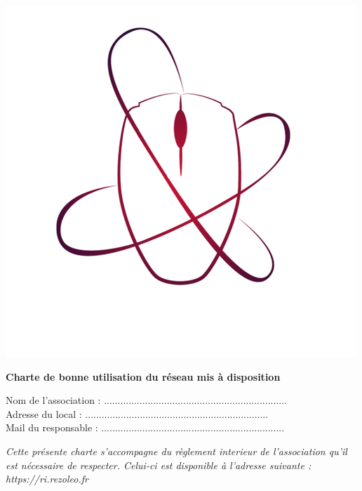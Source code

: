 \documentclass[11pt]{article}
\begin{document}
	
\thispagestyle{empty}

\begin{minipage}{0.15\linewidth}
	\includegraphics[scale=0.18]{rezoleo.png}
\end{minipage}\hfill
\begin{minipage}{0.80\linewidth}\center
{\LARGE \textbf{Charte de bonne utilisation du réseau mis à disposition}}

\vspace*{0.5cm}

\begin{flushright}
	Nom de l'association : ...................................................................\\
	Adresse du local : ...................................................................\\
	Mail du responsable : ...................................................................\\
\end{flushright}
\end{minipage}
\vspace*{0.5cm}

\textit{Cette présente charte s'accompagne du règlement interieur de l'association qu'il est nécessaire de respecter. Celui-ci est disponible à l'adresse suivante : https://ri.rezoleo.fr}
\end{document}
